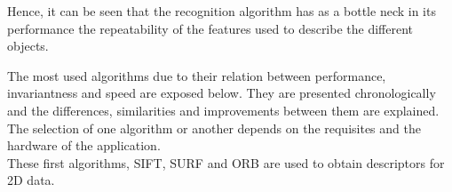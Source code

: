 Hence, it can be seen that the recognition algorithm has as a bottle neck in its performance the repeatability of the features used to describe the different objects. 

The most used algorithms due to their relation between performance, invariantness and speed are exposed below. They are presented chronologically and the differences, similarities and improvements between them are explained. 
\\

The selection of one algorithm or another depends on the requisites and the hardware of the application.
\\

These first algorithms, SIFT, SURF and ORB are used to obtain descriptors for 2D data. 

		
		
		



